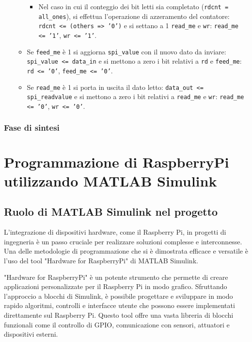 \documentclass[titlepage]{report}
\begin{document}
\begin{itemize}
\begin{itemize}
\begin{itemize}
						\item Nel caso in cui il conteggio dei bit letti sia completato (\texttt{rdcnt = all\_ones}), si effettua l'operazione di azzeramento del contatore: \texttt{rdcnt <= (others => '0')} e si settano a 1 \texttt{read\_me} e \texttt{wr}: \texttt{read\_me <= '1'}, \texttt{wr <= '1'}.
					\end{itemize}
					\item Se \texttt{feed\_me} è 1 si aggiorna \texttt{spi\_value} con il nuovo dato da inviare: \texttt{spi\_value <= data\_in} e si mettono a zero i bit relativi a \texttt{rd} e \texttt{feed\_me}: \texttt{rd <= '0'}, \texttt{feed\_me <= '0'}.
					\item Se \texttt{read\_me} è 1 si porta in uscita il dato letto: \texttt{data\_out <= spi\_readvalue} e si mettono a zero i bit relativi a \texttt{read\_me} e \texttt{wr}: \texttt{read\_me <= '0'}, \texttt{wr <= '0'}.
				\end{itemize}
			\end{itemize}

		\subsection*{Fase di sintesi}
		\label{subsec:spi_sintesi}
			
\chapter*{Programmazione di RaspberryPi utilizzando MATLAB Simulink}
\label{ch:programmazione_raspberrypi}

	\section*{Ruolo di MATLAB Simulink nel progetto}
	\label{sec:ruolo_simulink}

		L'integrazione di dispositivi hardware, come il Raspberry Pi, in progetti di ingegneria è un passo cruciale per realizzare soluzioni complesse e interconnesse. Una delle metodologie di programmazione che si è dimostrata efficace e versatile è l'uso del tool "Hardware for RaspberryPi" di MATLAB Simulink.

		"Hardware for RaspberryPi" è un potente strumento che permette di creare applicazioni personalizzate per il Raspberry Pi in modo grafico. Sfruttando l'approccio a blocchi di Simulink, è possibile progettare e sviluppare in modo rapido algoritmi, controlli e interfacce utente che possono essere implementati direttamente sul Raspberry Pi. Questo tool offre una vasta libreria di blocchi funzionali come il controllo di GPIO, comunicazione con sensori, attuatori e dispositivi esterni. 
		
\end{document}
